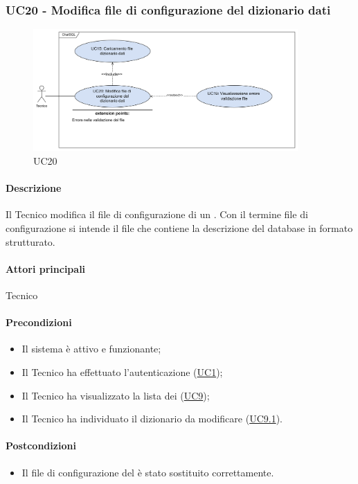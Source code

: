 \subsubsection{UC20 - Modifica file di configurazione del dizionario dati}\label{UC20}

\begin{figure}[H]
  \centering
  \includegraphics[width=0.90\textwidth]{assets/uc20.png}
  \caption{UC20}
\end{figure}

\paragraph*{Descrizione}
Il Tecnico modifica il file di configurazione di un . Con il termine file di configurazione si intende il file che contiene la descrizione del database in formato strutturato. 

\paragraph*{Attori principali}
Tecnico

\paragraph*{Precondizioni}
\begin{itemize}
  \item Il sistema è attivo e funzionante;
  \item Il Tecnico ha effettuato l'autenticazione (\hyperref[UC1]{UC1});
  \item Il Tecnico ha visualizzato la lista dei  (\hyperref[UC9]{UC9});
  \item Il Tecnico ha individuato il dizionario da modificare (\hyperref[UC9.1]{UC9.1}).
\end{itemize}

\paragraph*{Postcondizioni}
\begin{itemize}
  \item Il file di configurazione del  è stato sostituito correttamente.
\end{itemize}

